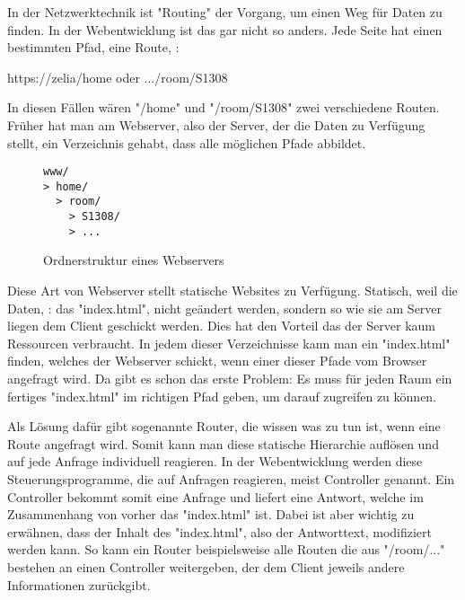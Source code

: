 \label{sec:csrouter}


In der Netzwerktechnik ist "Routing" der Vorgang, um einen Weg für Daten zu finden. In der Webentwicklung ist das gar nicht so anders. Jede Seite hat einen bestimmten Pfad, eine Route, \zb:

{\ttfamily https://zelia/home} oder {\ttfamily .../room/S1308}

In diesen Fällen wären "{\ttfamily /home}" und "{\ttfamily /room/S1308}" zwei verschiedene Routen. Früher hat man am Webserver, also der Server, der die Daten zu Verfügung stellt, ein Verzeichnis gehabt, dass alle möglichen Pfade abbildet.

\begin{figure}[H]
    \begin{lstlisting}
www/
> home/
  > room/
    > S1308/
    > ...
    \end{lstlisting}
    \caption{Ordnerstruktur eines Webservers}
\end{figure}

Diese Art von Webserver stellt statische Websites zu Verfügung. Statisch, weil die Daten, \zb: das "{\ttfamily index.html}", nicht geändert werden, sondern so wie sie am Server liegen dem Client geschickt werden. Dies hat den Vorteil das der Server kaum Ressourcen verbraucht. In jedem dieser Verzeichnisse kann man ein "{\ttfamily index.html}" finden, welches der Webserver schickt, wenn einer dieser Pfade vom Browser angefragt wird. Da gibt es schon das erste Problem: Es muss für jeden Raum ein fertiges "{\ttfamily index.html}" im richtigen Pfad geben, um darauf zugreifen zu können.

Als Lösung dafür gibt sogenannte Router, die wissen was zu tun ist, wenn eine Route angefragt wird. Somit kann man diese statische Hierarchie auflösen und auf jede Anfrage individuell reagieren. In der Webentwicklung werden diese Steuerungsprogramme, die auf Anfragen reagieren, meist Controller genannt. Ein Controller bekommt somit eine Anfrage und liefert eine Antwort, welche im Zusammenhang von vorher das "{\ttfamily index.html}" ist. Dabei ist aber wichtig zu erwähnen, dass der Inhalt des "{\ttfamily index.html}", also der Antworttext, modifiziert werden kann. So kann ein Router beispielsweise alle Routen die aus "{\ttfamily /room/...}" bestehen an einen Controller weitergeben, der dem Client jeweils andere Informationen zurückgibt.

